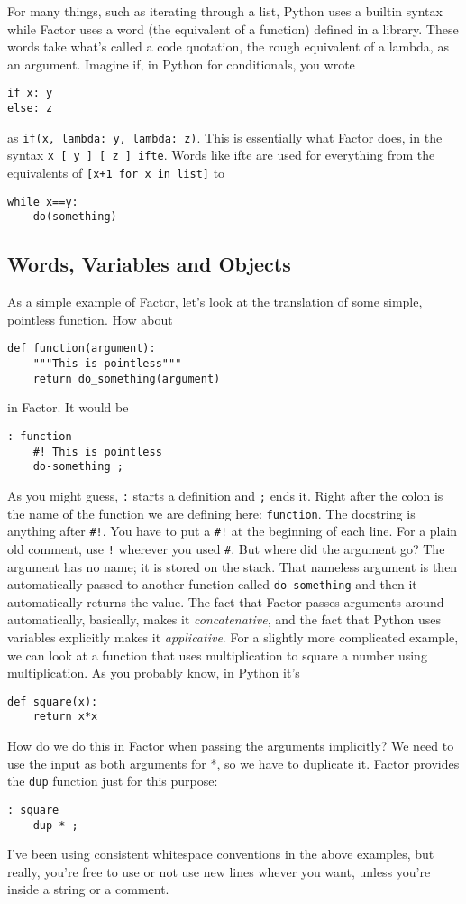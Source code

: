 \documentclass{article}
\begin{document}
For many things, such as iterating through a list, Python uses a builtin syntax while Factor uses a word (the equivalent of a function) defined in a library. These words take what's called a code quotation, the rough equivalent of a lambda, as an argument. Imagine if, in Python for conditionals, you wrote
\begin{verbatim}
if x: y
else: z
\end{verbatim}
as \verb|if(x, lambda: y, lambda: z)|. This is essentially what Factor does, in the syntax \verb|x [ y ] [ z ] ifte|. Words like ifte are used for everything from the equivalents of \verb|[x+1 for x in list]| to
\begin{verbatim}
while x==y:
    do(something)
\end{verbatim}

\subsection{Words, Variables and Objects}

As a simple example of Factor, let's look at the translation of some simple, pointless function. How about
\begin{verbatim}
def function(argument):
    """This is pointless"""
    return do_something(argument)
\end{verbatim}
in Factor. It would be
\begin{verbatim}
: function
    #! This is pointless
    do-something ;
\end{verbatim}
As you might guess, \texttt{:} starts a definition and \texttt{;} ends it. Right after the colon is the name of the function we are defining here: \texttt{function}. The docstring is anything after \verb|#!|. You have to put a \verb|#!| at the beginning of each line. For a plain old comment, use \texttt{!} wherever you used \verb|#|. But where did the argument go? The argument has no name; it is stored on the stack. That nameless argument is then automatically passed to another function called \texttt{do-something} and then it automatically returns the value. The fact that Factor passes arguments around automatically, basically, makes it \emph{concatenative}, and the fact that Python uses variables explicitly makes it \emph{applicative}. For a slightly more complicated example, we can look at a function that uses multiplication to square a number using multiplication. As you probably know, in Python it's
\begin{verbatim}
def square(x):
    return x*x
\end{verbatim}
How do we do this in Factor when passing the arguments implicitly? We need to use the input as both arguments for *, so we have to duplicate it. Factor provides the \texttt{dup} function just for this purpose:
\begin{verbatim}
: square
    dup * ;
\end{verbatim}
I've been using consistent whitespace conventions in the above examples, but really, you're free to use or not use new lines whever you want, unless you're inside a string or a comment.
\end{document}
